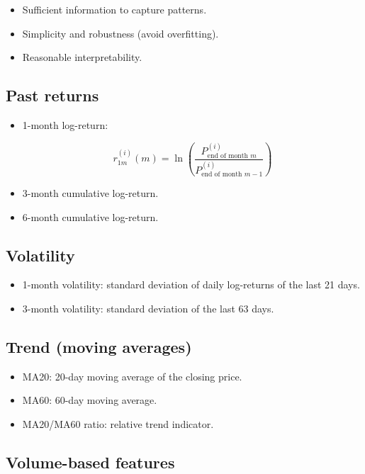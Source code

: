 \documentclass[12pt]{article}
\begin{document}
\begin{itemize}
    \item Sufficient information to capture patterns.
    \item Simplicity and robustness (avoid overfitting).
    \item Reasonable interpretability.
\end{itemize}

\subsection{Past returns}

\begin{itemize}
    \item 1-month log-return:
    

\[
    r_{1m}^{(i)}(m) = \ln\left(\frac{P_{\text{end of month } m}^{(i)}}{P_{\text{end of month } m-1}^{(i)}}\right)
    \]


    \item 3-month cumulative log-return.
    \item 6-month cumulative log-return.
\end{itemize}

\subsection{Volatility}

\begin{itemize}
    \item 1-month volatility: standard deviation of daily log-returns of the last 21 days.
    \item 3-month volatility: standard deviation of the last 63 days.
\end{itemize}

\subsection{Trend (moving averages)}

\begin{itemize}
    \item MA20: 20-day moving average of the closing price.
    \item MA60: 60-day moving average.
    \item MA20/MA60 ratio: relative trend indicator.
\end{itemize}

\subsection{Volume-based features}
\end{document}
